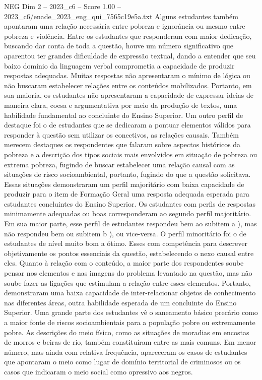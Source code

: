 \begin{textsample}{NEG Dim 2 – 2023\_c6 – Score 1.00 – 2023\_c6/enade\_2023\_eng\_qui\_7565c19e5a.txt}
Alguns estudantes também apontaram uma relação necessária entre pobreza e ignorância ou mesmo entre pobreza e violência.
Entre os estudantes que responderam com maior dedicação, buscando dar conta de toda a questão, houve um número significativo que aparentou ter grandes dificuldade de expressão textual, dando a entender que seu baixo domínio da linguagem verbal comprometia a capacidade de produzir respostas adequadas.
Muitas respostas não apresentaram o mínimo de lógica ou não buscaram estabelecer relações entre os conteúdos mobilizados.
Portanto, em sua maioria, os estudantes não apresentaram a capacidade de expressar ideias de maneira clara, coesa e argumentativa por meio da produção de textos, uma habilidade fundamental ao concluinte do Ensino Superior.
Um outro perfil de destaque foi o de estudantes que se dedicaram a pontuar elementos válidos para responder à questão sem utilizar os conectivos, as relações causais.
Também merecem destaques os respondentes que falaram sobre aspectos históricos da pobreza e a descrição dos tipos sociais mais envolvidos em situação de pobreza ou extrema pobreza, fugindo de buscar estabelecer uma relação causal com as situações de risco socioambiental, portanto, fugindo do que a questão solicitava.
Essas situações demonstraram um perfil majoritário com baixa capacidade de produzir para o item de Formação Geral uma resposta adequada esperada para estudantes concluintes do Ensino Superior.
Os estudantes com perfis de respostas minimamente adequadas ou boas corresponderam ao segundo perfil majoritário.
Em sua maior parte, esse perfil de estudantes respondeu bem ao subitem a ), mas não respondeu bem ou subitem b ), ou vice-versa.
O perfil minoritário foi o de estudantes de nível muito bom a ótimo.
Esses com competência para descrever objetivamente os pontos essenciais da questão, estabelecendo o nexo causal entre eles.
Quanto à relação com o conteúdo, a maior parte dos respondentes soube pensar nos elementos e nas imagens do problema levantado na questão, mas não soube fazer as ligações que estimulam a relação entre esses elementos.
Portanto, demonstraram uma baixa capacidade de inter-relacionar objetos de conhecimento nas diferentes áreas, outra habilidade esperada de um concluinte do Ensino Superior.
Uma grande parte dos estudantes vê o saneamento básico precário como a maior fonte de riscos socioambientais para a população pobre ou extremamente pobre.
As descrições do meio físico, como as situações de moradias em encostas de morros e beiras de rio, também constituíram entre as mais comuns.
Em menor número, mas ainda com relativa frequência, apareceram os casos de estudantes que apontaram o meio como lugar de domínio territorial de criminosos ou os casos que indicaram o meio social como opressivo aos negros.

\end{textsample}
